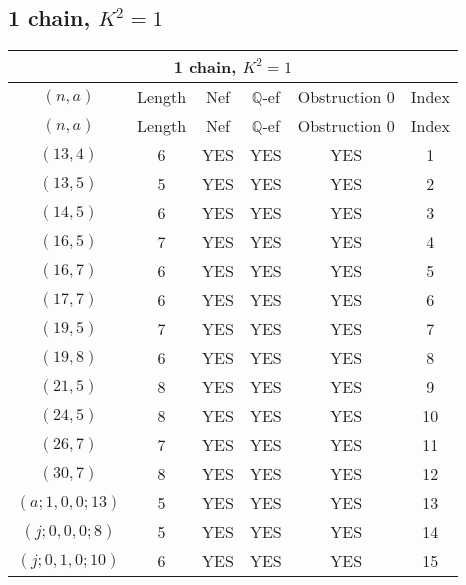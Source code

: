 \subsection{1 chain, $K^2 = 1$}
\begin{longtable}{|c|c|c|c|c|c|}
\hline
\multicolumn{6}{|c|}{1 chain, $K^2 = 1$}\\
\hline
$(n,a)$ & Length & Nef & $\mathbb Q$-ef & Obstruction 0 & Index\\
\hline
\endfirsthead

\hline
$(n,a)$ & Length & Nef & $\mathbb Q$-ef & Obstruction 0 & Index\\
\hline
\endhead
\hline
\endfoot

$(13, 4)$ & 6 & YES & YES & YES & 1\\
$(13, 5)$ & 5 & YES & YES & YES & 2\\
$(14, 5)$ & 6 & YES & YES & YES & 3\\
$(16, 5)$ & 7 & YES & YES & YES & 4\\
$(16, 7)$ & 6 & YES & YES & YES & 5\\
$(17, 7)$ & 6 & YES & YES & YES & 6\\
$(19, 5)$ & 7 & YES & YES & YES & 7\\
$(19, 8)$ & 6 & YES & YES & YES & 8\\
$(21, 5)$ & 8 & YES & YES & YES & 9\\
$(24, 5)$ & 8 & YES & YES & YES & 10\\
$(26, 7)$ & 7 & YES & YES & YES & 11\\
$(30, 7)$ & 8 & YES & YES & YES & 12\\
$(a; 1, 0, 0; 13)$ & 5 & YES & YES & YES & 13\\
$(j; 0, 0, 0; 8)$ & 5 & YES & YES & YES & 14\\
$(j; 0, 1, 0; 10)$ & 6 & YES & YES & YES & 15
\end{longtable}
